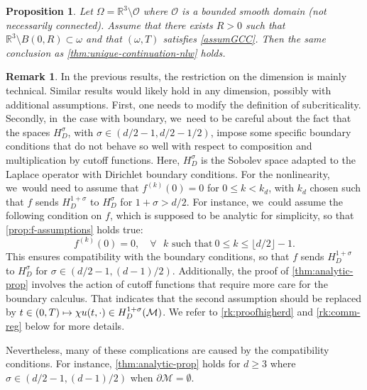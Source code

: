 \documentclass[10pt]{amsart}
\newcommand\mto{\mathchoice{\longmapsto}{\mapsto}{\mapsto}{\mapsto}}
\newtheorem{proposition}[theorem]{Proposition}
\theoremstyle{definition}
\newtheorem{remark}[theorem]{Remark}
\let\mc\mathcal
\newcommand{\M}{\mc{M}}
\newcommand{\R}{\mathbb{R}}
\begin{document}
\begin{proposition}
\label{propR3obstacle}
Let $\Omega=\R^3\setminus \mathcal{O}$ where $\mathcal{O}$ is a bounded smooth domain (not necessarily connected). Assume that there exists $R>0$ such that $\R^3\setminus B(0,R)\subset \omega$ and that $(\omega,T)$ satisfies \ref{assumGCC}. Then the same conclusion as \cref{thm:unique-continuation-nlw} holds.
\end{proposition}
\begin{remark}
\label{rk:higherd}
In the previous results, the restriction on the dimension is mainly technical. Similar results would likely hold in any dimension, possibly with additional assumptions. First, one needs to modify the definition of subcriticality. Secondly, in~the case with boundary, we~need to be careful about the fact that the spaces $H^{\sigma}_D$, with $\sigma \in (d/2-1,d/2-1/2)$, impose some specific boundary conditions that do not behave so well with respect to composition and multiplication by cutoff functions. Here, $H^{\sigma}_D$ is the Sobolev space adapted to the Laplace operator with Dirichlet boundary conditions. For the nonlinearity, we~would need to assume that $f^{(k)}(0)=0$ for \hbox{$0\leq k<k_d$}, with $k_d$ chosen such that $f$ sends $H^{1+\sigma}_D$ to $H^{\sigma}_D$ for $1+\sigma>d/2$.
For instance, we~could assume the following condition on $f$, which is supposed to be analytic for simplicity, so that \cref{prop:f-assumptions} holds true:
\begin{equation*}
f^{(k)}(0)=0, \quad \forall\text{ $k$ such that}~0\leq k\leq \lfloor d/2\rfloor-1.
\end{equation*}
This ensures compatibility with the boundary conditions, so that $f$ sends $H^{1+\sigma}_D$ to $H^{\sigma}_D$ for $\sigma\in (d/2-1, (d-1)/2)$. Additionally, the proof of \cref{thm:analytic-prop} involves the action of cutoff functions that require more care for the boundary calculus. That indicates that the second assumption should be replaced by $t\in (0, T)\mto \chi u(t,\cdot)\in H^{1+\sigma}_D(\M)$.
We refer to \cref{rk:proofhigherd} and \cref{rk:comm-reg} below for more details.

Nevertheless, many of these complications are caused by the compatibility conditions. For instance, \cref{thm:analytic-prop} holds for $d\geq 3$ where $\sigma\in (d/2-1, (d-1)/2)$ when $\partial\M=\emptyset$.
\end{remark}
\end{document}
